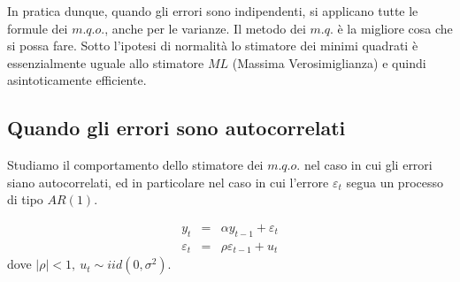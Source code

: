 \documentclass[a4paper]{report}
\theoremstyle{remark}
\begin{document}
In pratica dunque, quando gli errori sono indipendenti, si applicano tutte
le formule dei $m.q.o.$, anche per le varianze. Il metodo dei $m.q.$ \`{e}
la migliore cosa che si possa fare. Sotto l'ipotesi di normalit\`{a} lo
stimatore dei minimi quadrati \`{e} essenzialmente uguale allo stimatore $ML$
(Massima Verosimiglianza) e quindi asintoticamente efficiente.

\subsection{Quando gli errori sono autocorrelati}

Studiamo il comportamento dello stimatore dei $m.q.o.$ nel caso in cui gli
errori siano autocorrelati, ed in particolare nel caso in cui l'errore $%
\varepsilon _{t}$ segua un processo di tipo $AR(1)$.

\begin{eqnarray}
y_{t} &=&\alpha y_{t-1}+\varepsilon _{t}  \label{ar1_errore1} \\
\varepsilon _{t} &=&\rho \varepsilon _{t-1}+u_{t}  \label{ar1_errore2}
\end{eqnarray}%
dove $\mid \rho \mid <1,\ u_{t}\sim iid(0,\sigma ^{2})$.
\end{document}
